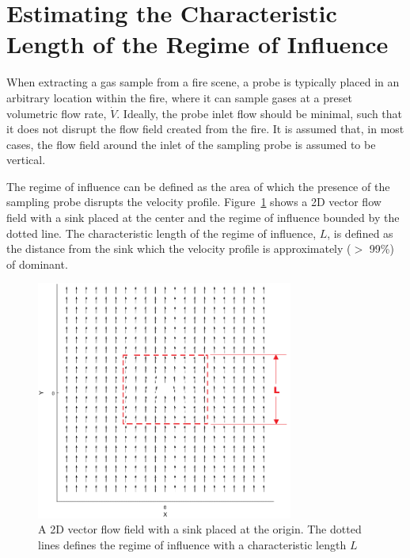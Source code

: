 \documentclass[12pt]{article}
\begin{document}
\pagebreak

\section{Estimating the Characteristic Length of the Regime of Influence}\label{sec:Regime_of_Influence}

When extracting a gas sample from a fire scene, a probe is typically placed in an arbitrary location within the fire, where it can sample gases at a preset volumetric flow rate, ${\dot{V}}$. Ideally, the probe inlet flow should be minimal, such that it does not disrupt the flow field created from the fire. It is assumed that, in most cases, the flow field around the inlet of the sampling probe is assumed to be vertical.

The regime of influence can be defined as the area of which the presence of the sampling probe disrupts the velocity profile. Figure~\ref{fig:Potential Flow} shows a 2D vector flow field with a sink placed at the center and the regime of influence bounded by the dotted line. The characteristic length of the regime of influence, $L$, is defined as the distance from the sink which the velocity profile is approximately ($>$ 99\%) of dominant.
\begin{figure}[h!]
	\centering
\includegraphics[width=8.45cm,keepaspectratio]{Potential_Flow.png}
	\caption{A 2D vector flow field with a sink placed at the origin. The dotted lines defines the regime of influence with a characteristic length $L$}
	\label{fig:Potential Flow}
\end{figure}
\end{document}
